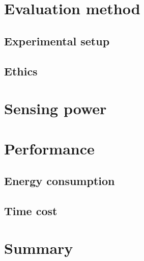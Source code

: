 \section{Evaluation method}
\subsection{Experimental setup}
\subsection{Ethics}

\section{Sensing power}
\section{Performance}
\subsection{Energy consumption}
\subsection{Time cost}
\section{Summary}
